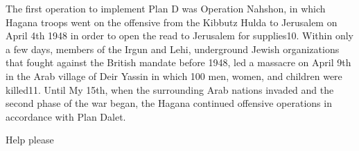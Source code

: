 \documentclass{turabian-researchpaper}
\begin{document}
The first operation to implement Plan D was Operation Nahshon, in which Hagana troops went on the offensive from the Kibbutz Hulda to Jerusalem on April 4th 1948 in order to open the read to Jerusalem for supplies10.  Within only a few days, members of the Irgun and Lehi, underground Jewish organizations that fought against the British mandate before 1948, led a massacre on April 9th in the Arab village of Deir Yassin in which 100 men, women, and children were killed11.  Until My 15th, when the surrounding Arab nations invaded and the second phase of the war began, the Hagana continued offensive operations in accordance with Plan Dalet.


Help please
\end{document}
